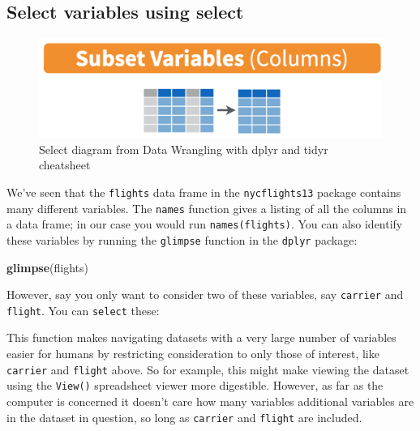 \documentclass[12pt,]{krantz}
\makeatletter
\newenvironment{Shaded}{\begin{snugshade}}{\end{snugshade}}
\newcommand{\KeywordTok}[1]{\textcolor[rgb]{0.27,0.27,0.27}{\textbf{#1}}}
\newcommand{\StringTok}[1]{\textcolor[rgb]{0.5,0.5,0.5}{#1}}
\newcommand{\OperatorTok}[1]{\textcolor[rgb]{0.43,0.43,0.43}{\textbf{#1}}}
\newcommand{\NormalTok}[1]{#1}
\newenvironment{kframe}{%
\medskip{}
\setlength{\fboxsep}{.8em}
 \def\at@end@of@kframe{}%
 \ifinner\ifhmode%
  \def\at@end@of@kframe{\end{minipage}}%
  \begin{minipage}{\columnwidth}%
 \fi\fi%
 \def\FrameCommand##1{\hskip\@totalleftmargin \hskip-\fboxsep
 \colorbox{shadecolor}{##1}\hskip-\fboxsep
     \hskip-\linewidth \hskip-\@totalleftmargin \hskip\columnwidth}%
 \MakeFramed {\advance\hsize-\width
   \@totalleftmargin\z@ \linewidth\hsize
   \@setminipage}}%
 {\par\unskip\endMakeFramed%
 \at@end@of@kframe}
\renewenvironment{Shaded}{\begin{kframe}}{\end{kframe}}
\theoremstyle{definition}
\theoremstyle{definition}
\theoremstyle{definition}
\theoremstyle{remark}
\makeatother
\begin{document}
\subsection{Select variables using select}\label{select}

\begin{figure}

{\centering \includegraphics[width=\textwidth]{images/select} 

}

\caption{Select diagram from Data Wrangling with dplyr and tidyr cheatsheet}\label{fig:selectfig}
\end{figure}

We've seen that the \texttt{flights} data frame in the
\texttt{nycflights13} package contains many different variables. The
\texttt{names} function gives a listing of all the columns in a data
frame; in our case you would run \texttt{names(flights)}. You can also
identify these variables by running the \texttt{glimpse} function in the
\texttt{dplyr} package:

\begin{Shaded}
\begin{Highlighting}[]
\KeywordTok{glimpse}\NormalTok{(flights)}
\end{Highlighting}
\end{Shaded}

However, say you only want to consider two of these variables, say
\texttt{carrier} and \texttt{flight}. You can \texttt{select} these:

\begin{Shaded}
\end{Shaded}

This function makes navigating datasets with a very large number of
variables easier for humans by restricting consideration to only those
of interest, like \texttt{carrier} and \texttt{flight} above. So for
example, this might make viewing the dataset using the \texttt{View()}
spreadsheet viewer more digestible. However, as far as the computer is
concerned it doesn't care how many variables additional variables are in
the dataset in question, so long as \texttt{carrier} and \texttt{flight}
are included.
\end{document}
